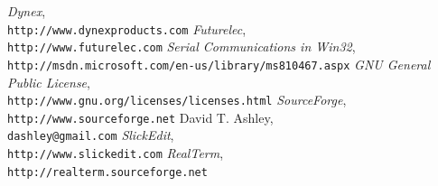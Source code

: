 \documentclass[letterpaper,10pt,titlepage]{article}
\newenvironment{docglossaryenum}{\begin{list}
               {}{\setlength{\labelwidth}{0mm}
                  \setlength{\leftmargin}{4mm}
                  \setlength{\itemindent}{-4mm}
                  \setlength{\parsep}{0.85mm}}}
               {\end{list}}
\begin{document}






\clearpage{}

\begin{thebibliography}{000}
   \emph{Dynex},\\
   \texttt{http://www.dynexproducts.com}
   \emph{Futurelec},\\
   \texttt{http://www.futurelec.com}
   \emph{Serial Communications in Win32},\\
   \texttt{http://msdn.microsoft.com/en-us/library/ms810467.aspx}
   \emph{GNU General Public License},\\
   \texttt{http://www.gnu.org/licenses/licenses.html}
   \emph{SourceForge},\\
   \texttt{http://www.sourceforge.net}
   David T. Ashley,\\
   \texttt{dashley@gmail.com}
   \emph{SlickEdit},\\
   \texttt{http://www.slickedit.com}
   \emph{RealTerm},\\
   \texttt{http://realterm.sourceforge.net}
\end{thebibliography}

\clearpage{}
\printindex

\end{document}
